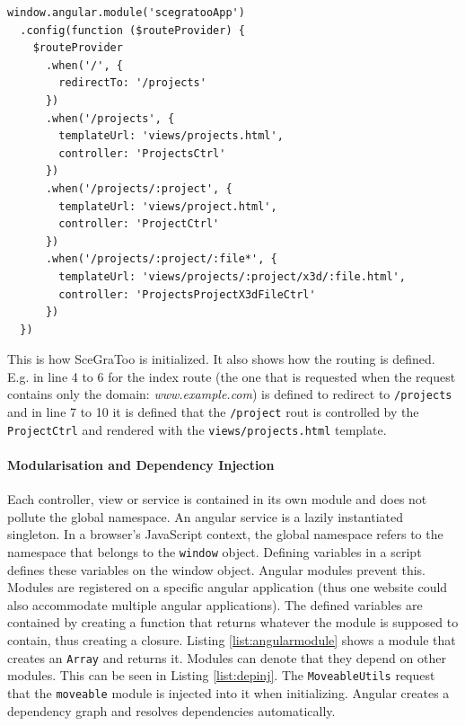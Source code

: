 \begin{listing}
  \begin{verbatim}
window.angular.module('scegratooApp')
  .config(function ($routeProvider) {
    $routeProvider
      .when('/', {
        redirectTo: '/projects'
      })
      .when('/projects', {
        templateUrl: 'views/projects.html',
        controller: 'ProjectsCtrl'
      })
      .when('/projects/:project', {
        templateUrl: 'views/project.html',
        controller: 'ProjectCtrl'
      })
      .when('/projects/:project/:file*', {
        templateUrl: 'views/projects/:project/x3d/:file.html',
        controller: 'ProjectsProjectX3dFileCtrl'
      })
  })
  \end{verbatim}
  \caption{
    This is how \gls{SceGraToo} is initialized. It also shows how the routing is defined.
    E.g. in line 4 to 6 for the index route (the one that is requested when the request
    contains only the domain: \emph{www.example.com}) is defined to redirect to \texttt{/projects}
    and in line 7 to 10 it is defined that the \texttt{/project} rout is controlled by
    the \texttt{ProjectCtrl} and rendered with the \texttt{views/projects.html} template.
  }
  \label{list:bootstrap}
\end{listing}

\paragraph{Modularisation and Dependency Injection}
\label{par:modularisation}

Each controller, view or service is contained in its own module and does not
pollute the global namespace.
An angular service is a lazily instantiated singleton.
In a browser's JavaScript context, the global
namespace refers to the namespace that belongs to the \texttt{window} object.
Defining variables in a script defines these variables on the window object.
Angular modules prevent this. Modules are registered on a specific angular
application (thus one website could also accommodate multiple angular
applications). The defined variables are contained by creating a function that
returns whatever the module is supposed to contain, thus creating a closure.
Listing \ref{list:angularmodule} shows a module that creates an \texttt{Array} and
returns it. Modules can denote that they depend on other modules. This can be
seen in Listing \ref{list:depinj}. The \texttt{MoveableUtils} request that the
\texttt{moveable} module is injected into it when initializing. Angular creates
a dependency graph and resolves dependencies automatically.


